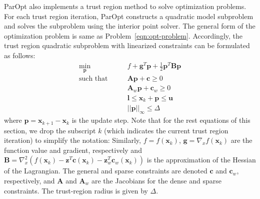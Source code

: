 \documentclass[12pt]{article}
\newcommand{\mb}{\mathbf}
\begin{document}
ParOpt also implements a trust region method to solve optimization problems. 
For each trust region iteration, ParOpt constructs a quadratic model subproblem and solves the subproblem using the interior point solver.
The general form of the optimization problem is same as Problem~\eqref{eqn:opt-problem}.
Accordingly, the trust region quadratic subproblem with linearized constraints can be formulated as follows:
%
\begin{equation}
  \label{eqn:quad-problem}
  \begin{aligned}
    \min_{\mb{p}} \qquad & f + \mb{g}^T\mb{p} + \frac{1}{2}\mb{p}^T\mb{B}\mb{p} \\
    \text{such that} \qquad
    & \mb{A}\mb{p} + \mb{c} \ge 0 \\
    & \mb{A}_{w}\mb{p} + \mb{c}_{w} \ge 0 \\
    & \mb{l} \le \mb{x}_k + \mb{p} \le \mb{u} \\
    & ||\mb{p}||_\infty \le \Delta
  \end{aligned}
\end{equation}
%
where $\mb{p} = \mb{x}_{k+1} - \mb{x}_{k}$ is the update step.
Note that for the rest equations of this section, we drop the subscript $k$ (which indicates the current trust region iteration) to simplify the notation:
Similarly, $f = f(\mb{x}_k)$, $\mb{g} = \nabla_x f(\mb{x}_k)$ are the function value and gradient, respectively and $\mb{B} = \nabla_x^2 (f(\mb{x}_k) - \mb{z}^T \mb{c}(\mb{x}_k)-\mb{z}_w^T \mb{c}_w(\mb{x}_k))$ is the approximation of the Hessian of the Lagrangian. 
The general and sparse constraints are denoted $\mb{c}$ and $\mb{c}_{w}$, respectively, and $\mb{A}$ and $\mb{A}_w$ are the Jacobians for the dense and sparse constraints.
The trust-region radius is given by $\Delta$.
\end{document}
